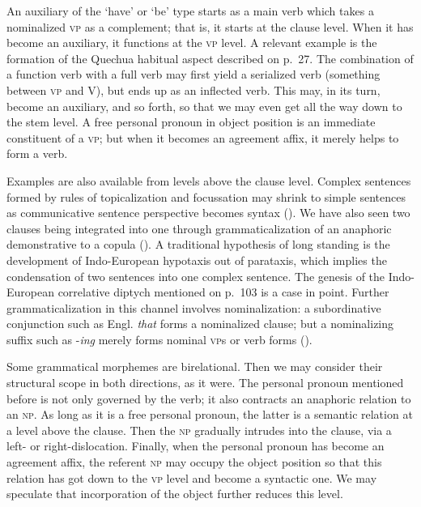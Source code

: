 An auxiliary of the ‘have’ or ‘be’ type starts as a main verb which takes a nominalized \textsc{vp} as a complement; that is, it starts at the clause level. When it has become an auxiliary, it functions at the \textsc{vp} level. A relevant example is the formation of the Quechua habitual aspect described on p.~27. The combination of a function verb with a full verb may first yield a serialized verb (something between \textsc{vp} and V), but ends up as an inflected verb. This may, in its turn, become an auxiliary, and so forth, so that we may even get all the way down to the stem level. A free personal pronoun in object position is an immediate constituent of a \textsc{vp}; but when it becomes an agreement affix, it merely helps to form a verb.

Examples are also available from levels above the clause level. Complex sentences formed by rules of topicalization and focussation may shrink to simple sentences as communicative sentence perspective becomes syntax (). We have also seen two clauses being integrated into one through grammaticalization of an anaphoric demonstrative to a copula (). A traditional hypothesis of long standing is the development of Indo-European hypotaxis out of parataxis, which implies the condensation of two sentences into one complex sentence. The genesis of the Indo-European correlative diptych mentioned on p.~103 is a case in point. Further grammaticalization in this channel involves nominalization: a subordinative conjunction such as Engl. \textit{that} forms a nominalized clause; but a nominalizing suffix such as -\textit{ing} merely forms nominal \textsc{vp}s or verb forms ().

Some grammatical morphemes are birelational. Then we may consider their structural scope in both directions, as it were. The personal pronoun mentioned before is not only governed by the verb; it also contracts an anaphoric relation to an \textsc{np}. As long as it is a free personal pronoun, the latter is a semantic relation at a level above the clause. Then the \textsc{np} gradually intrudes into the clause, via a left- or right-dislocation. Finally, when the personal pronoun has become an agreement affix, the referent \textsc{np} may occupy the object position so that this relation has got down to the \textsc{vp} level and become a syntactic one. We may speculate that incorporation of the object further reduces this level.

